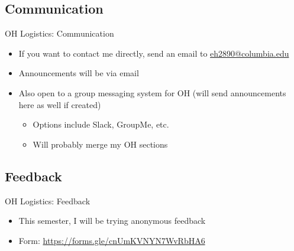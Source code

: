 \documentclass{../slides}
\begin{document}
\subsection{Communication}
\begin{frame}{OH Logistics: Communication}
    \begin{itemize}
        \item If you want to contact me directly, send an email to \href{mailto:eh2890@columbia.edu}{eh2890@columbia.edu}
        \item Announcements will be via email
        \item Also open to a group messaging system for OH (will send announcements here as well if created)
        \begin{itemize}
            \item Options include Slack, GroupMe, etc.
            \item Will probably merge my OH sections
        \end{itemize}
    \end{itemize}
\end{frame}

\subsection{Feedback}
\begin{frame}{OH Logistics: Feedback}
    \begin{itemize}
        \item This semester, I will be trying anonymous feedback
        \item Form: \url{https://forms.gle/cnUmKVNYN7WvRbHA6}
    \end{itemize}
\end{frame}
\end{document}
